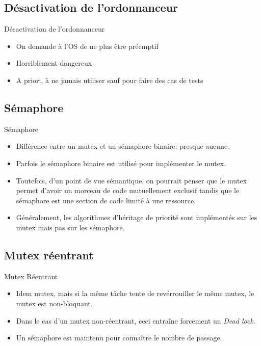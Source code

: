 \subsection{Désactivation de l'ordonnanceur}

\begin{frame}{Désactivation de l'ordonnanceur}
  \begin{itemize}
  \item On demande à l'OS de ne plus être préemptif
  \item Horriblement dangereux
  \item A  priori, à  ne jamais  utiliser sauf pour  faire des  cas de
    tests
  \end{itemize}
\end{frame}

\subsection{Sémaphore}

\begin{frame}{Sémaphore}
  \begin{itemize}
  \item  Différence entre un  mutex et  un sémaphore  binaire: presque
    aucune.
  \item Parfois  le sémaphore binaire est utilisé  pour implémenter le
    mutex.
  \item Toutefois,  d'un point de  vue sémantique, on  pourrait penser
    que  le  mutex permet  d'avoir  un  morceau  de code  mutuellement
    exclusif tandis que le sémaphore  est une section de code limité à
    une ressource.
  \item  Généralement,  les algorithmes  d'héritage  de priorité  sont
    implémentés sur les mutex mais pas sur les sémaphore.
  \end{itemize}
\end{frame}

\subsection{Mutex réentrant}

\begin{frame}{Mutex Réentrant}
  \begin{itemize}
  \item Idem  mutex, mais si la  même tâche tente  de revérrouiller le
    même mutex, le mutex est non-bloquant.
  \item Dans le cas  d'un mutex non-réentrant, ceci entraîne forcement
    un \emph{Dead lock}.
  \item Un sémaphore est maintenu pour connaître le nombre de passage.
  \end{itemize}
\end{frame}

